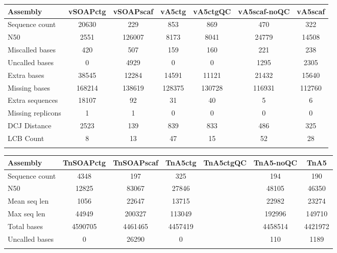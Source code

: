 \documentclass{bioinfo}
\begin{document}
\begin{table}[!t]
{\begin{tabular}{l|cccccc}\toprule
Assembly           & vSOAPctg & vSOAPscaf & vA5ctg & vA5ctgQC & vA5scaf-noQC & vA5scaf  \\\midrule
Sequence count     & 20630    & 229       & 853       & 869         & 470          & 322         \\
N50                & 2551     & 126007    & 8173      & 8041        & 24779        & 14508       \\
Miscalled bases    & 420      & 507       & 159       & 160         & 221          & 238         \\
Uncalled bases     & 0        & 4929      & 0         & 0           & 1295         & 2305        \\
Extra bases        & 38545    & 12284     & 14591     & 11121       & 21432        & 15640       \\
Missing bases      & 168214   & 138619    & 128375    & 130728      & 116931       & 112760      \\
Extra sequences    & 18107    & 92        & 31        & 40          & 5            & 6           \\
Missing replicons  & 1        & 1         & 0         & 0           & 0            & 0           \\
DCJ Distance       & 2523     & 139       & 839       & 833         & 486          & 325         \\
LCB Count          & 8        & 13        & 47        & 15          & 52           & 28          \\
\botrule \\
\end{tabular}}{}
\end{table}


\begin{table}[!t]
{\begin{tabular}{l|cccccc}\toprule
Assembly        & TnSOAPctg & TnSOAPscaf  & TnA5ctg   & TnA5ctgQC & TnA5-noQC & TnA5    \\\midrule
Sequence count  & 4348      & 197         &  325      &  & 194       & 190     \\
N50             & 12825     & 83067       &  27846    &  & 48105     & 46350   \\
Mean seq len    & 1056      & 22647       &  13715    &  & 22982     & 23274   \\
Max seq len     & 44949     & 200327      &  113049   &  & 192996    & 149710  \\
Total bases     & 4590705   & 4461465     &  4457419  &  & 4458514   & 4421972 \\
Uncalled bases  & 0         & 26290       &  0        &  & 110       & 1189    \\
\botrule \\
\end{tabular}}{}
\end{table}
\end{document}
